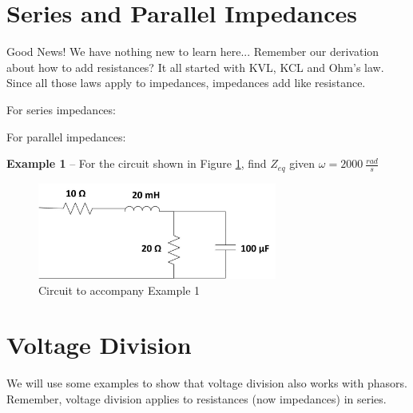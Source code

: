 \documentclass{handout}
\begin{document}
\section{Series and Parallel Impedances}
Good News!  We have nothing new to learn here... Remember our derivation about how to add resistances?  It all started with KVL, KCL and Ohm's law.  Since all those laws apply to impedances, impedances add like resistance.

For series impedances:
\soln{1in}{
\[
Z_{eq} = Z_1+Z_2+Z_3+.....+Z_k =\sum_{n=1}^k Z_n
\]
}

For parallel impedances:
\soln{1in}{
\[
Z_{eq} = \frac{1}{\frac{1}{Z_1}+\frac{1}{Z_2}+\frac{1}{Z_3}+.....+\frac{1}{Z_k}} =\left[\sum_{n=1}^k \frac{1}{Z_n}\right]^{-1}
\]
}

\textbf{Example 1} -- For the circuit shown in Figure \ref{fig: Example1}, find $Z_{eq}$ given $\omega = 2000\ \frac{rad}{s}$

\begin{figure} [h!]
\centering
\includegraphics[width=0.7\textwidth]{Example1.jpg}
\caption{Circuit to accompany Example 1}
\label{fig: Example1}
\end{figure}

\newpage
\clearpage
\pagebreak
\section{Voltage Division}
We will use some examples to show that voltage division also works with phasors.  Remember, voltage division applies to resistances (now impedances) in series.
\end{document}
